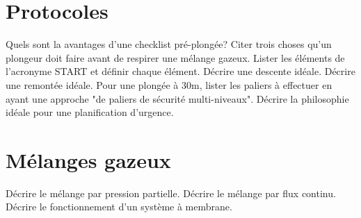 \documentclass[english,10pt,a4paper]{article}
\begin{document}
	\section{Protocoles}
	\begin{outline}
		\1 Quels sont la avantages d'une checklist pré-plongée?
		\1 Citer trois choses qu'un plongeur doit faire avant de respirer une mélange gazeux.
		\1 Lister les éléments de l'acronyme START et définir chaque élément.
			\2[S] \hrulefill
			\2[T] \hrulefill
			\2[A] \hrulefill
			\2[R] \hrulefill
			\2[T] \hrulefill
		\1 Décrire une descente idéale.
		\1 Décrire une remontée idéale.
		\1 Pour une plongée à 30m, lister les paliers à effectuer en ayant une approche "de paliers de sécurité multi-niveaux".
		\1 Décrire la philosophie idéale pour une planification d'urgence.
	\end{outline}
	\pagebreak

	\section{Mélanges gazeux}
	\begin{outline}
		\1 Décrire le mélange par pression partielle.
		\1 Décrire le mélange par flux continu.
		\1 Décrire le fonctionnement d'un système à membrane.
	\end{outline}
	\sectionpage
\end{document}
